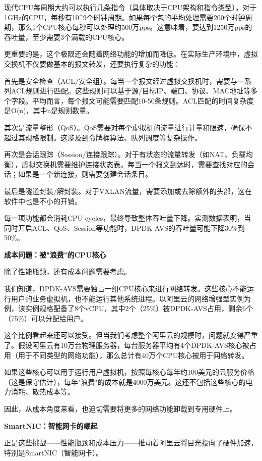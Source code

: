 现代CPU每周期大约可以执行几条指令（具体取决于CPU架构和指令类型）。对于1GHz的CPU，每秒有10^9个时钟周期。如果每个包的平均处理需要200个时钟周期，那么1个CPU核心每秒可以处理约500万pps。这意味着，要达到1250万pps的吞吐量，至少需要3个满载的CPU核心。

更重要的是，这个极限还会随着网络功能的增加而降低。在实际生产环境中，虚拟交换机不仅要做基本的报文转发，还要执行复杂的功能：

首先是安全检查（ACL/安全组）。每当一个报文经过虚拟交换机时，需要与一系列ACL规则进行匹配。这些规则可以基于源/目标IP、端口、协议、MAC地址等多个字段。平均而言，每个报文可能需要匹配10-50条规则。ACL匹配的时间复杂度是O(n)，其中n是规则数量。

其次是流量整形（QoS）。QoS需要对每个虚拟机的流量进行计量和限速，确保不超过其规格限制。这涉及到令牌桶算法、队列调度等复杂操作。

再次是会话跟踪（Session/连接跟踪）。对于有状态的流量转发（如NAT、负载均衡），虚拟交换机需要维护连接状态表。每当一个报文到达时，需要查找对应的会话；如果是一个新连接，则需要创建会话条目。

最后是隧道封装/解封装。对于VXLAN流量，需要添加或去除额外的头部，这在软件中也是不小的开销。

每一项功能都会消耗CPU cycles，最终导致整体吞吐量下降。实测数据表明，当同时开启ACL、QoS、Session等功能时，DPDK-AVS的吞吐量可能下降30\%到50\%。

\textbf{成本问题：被"浪费"的CPU核心}

除了性能瓶颈，还有成本问题需要考虑。

我们知道，DPDK-AVS需要独占一组CPU核心来进行网络转发。这些核心不能运行用户的业务虚拟机，也不能运行其他系统进程。以阿里云的网络增强型实例为例，该实例规格配备了8个vCPU，其中2个（25\%）被DPDK-AVS占用，剩余6个（75\%）可以分配给用户。

这个比例看起来还可以接受。但当我们考虑整个阿里云的规模时，问题就变得严重了。假设阿里云有10万台物理服务器，每台服务器平均有4个DPDK-AVS核心被占用（用于不同类型的网络功能），那么总计有40万个CPU核心被用于网络转发。

如果这些核心可以用于运行用户虚拟机，按照每核心每年约100美元的云服务价格（这是保守估计），每年"浪费"的成本就是4000万美元。这还不包括这些核心的电力消耗、散热成本等。

因此，从成本角度来看，也迫切需要将更多的网络功能卸载到专用硬件上。

\textbf{SmartNIC：智能网卡的崛起}

正是这些挑战——性能瓶颈和成本压力——推动着阿里云将目光投向了硬件加速，特别是SmartNIC（智能网卡）。

